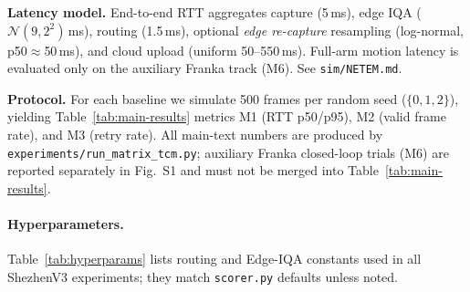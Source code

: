 \textbf{Latency model.} End-to-end RTT aggregates capture (5\,ms), edge IQA ($\mathcal{N}(9,2^2)$\,ms), routing (1.5\,ms), optional \emph{edge re-capture} resampling (log-normal, p50$\approx$50\,ms), and cloud upload (uniform 50--550\,ms). Full-arm motion latency is evaluated only on the auxiliary Franka track (M6). See \texttt{sim/NETEM.md}.

\textbf{Protocol.} For each baseline we simulate 500 frames per random seed ($\{0,1,2\}$), yielding Table~\ref{tab:main-results} metrics M1 (RTT p50/p95), M2 (valid frame rate), and M3 (retry rate).
All main-text numbers are produced by \texttt{experiments/run\_matrix\_tcm.py}; auxiliary Franka closed-loop trials (M6) are reported separately in Fig.~S1 and must not be merged into Table~\ref{tab:main-results}.

\paragraph{Hyperparameters.}
Table~\ref{tab:hyperparams} lists routing and Edge-IQA constants used in all ShezhenV3 experiments; they match \texttt{scorer.py} defaults unless noted.

\begin{table}[t]
\centering
\caption{Key hyperparameters (Paper~I, ShezhenV3 validation).}
\label{tab:hyperparams}
\small
{}
\end{table}
